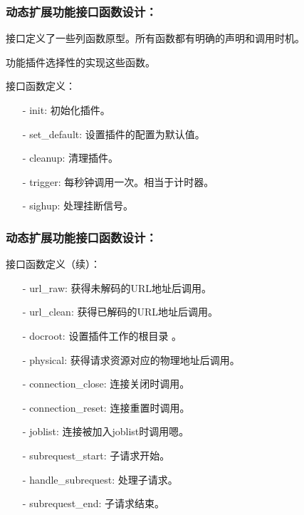 \documentclass[10pt,dvipdfm]{beamer}
\begin{document}
\begin{frame}
	\frametitle{动态扩展功能接口函数设计：}
	接口定义了一些列函数原型。所有函数都有明确的声明和调用时机。
	
	功能插件选择性的实现这些函数。
	
	\pause
	
	\begin{block}{接口函数定义：}
	\begin{itemize}
		\item[-] init: 初始化插件。
		\item[-] set\_default: 设置插件的配置为默认值。
		\item[-] cleanup: 清理插件。
		\item[-] trigger: 每秒钟调用一次。相当于计时器。
		\item[-] sighup: 处理挂断信号。
	\end{itemize}
	\end{block}
\end{frame}

\begin{frame}
	\frametitle{动态扩展功能接口函数设计：}
	\begin{block}{接口函数定义（续）：}
	\begin{itemize}
		\item[-] url\_raw: 获得未解码的URL地址后调用。
		\item[-] url\_clean: 获得已解码的URL地址后调用。
		\item[-] docroot: 设置插件工作的根目录 。
		\item[-] physical: 获得请求资源对应的物理地址后调用。
		\item[-] connection\_close: 连接关闭时调用。
		\item[-] connection\_reset: 连接重置时调用。
		\item[-] joblist: 连接被加入joblist时调用嗯。
		\item[-] subrequest\_start: 子请求开始。
		\item[-] handle\_subrequest: 处理子请求。
		\item[-] subrequest\_end: 子请求结束。
	\end{itemize}
	\end{block}
\end{frame}
\end{document}
